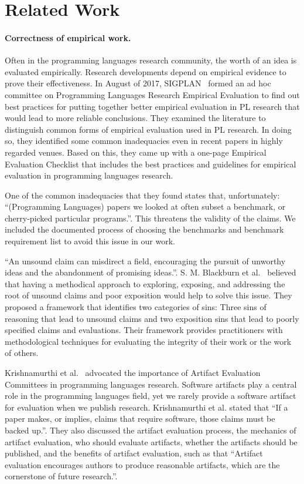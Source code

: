 \section{Related Work}

\paragraph{Correctness of empirical work.}


Often in the programming languages research community, the worth of an idea is evaluated empirically. Research developments depend on empirical evidence to prove their effectiveness.
In August of 2017, SIGPLAN~\cite{SIGPLAN} formed an ad hoc committee on Programming Languages Research Empirical Evaluation to find out best practices for putting together better empirical evaluation in PL research that would lead to more reliable conclusions. They examined the literature to distinguish common forms of empirical evaluation used in PL research. In doing so, they identified some common inadequacies even in recent papers in highly regarded venues. Based on this, they came up with a one-page Empirical Evaluation Checklist that includes the best practices and guidelines for empirical evaluation in programming languages research.

One of the common inadequacies that they found states that, unfortunately: ``(Programming Languages) papers we looked at often subset a benchmark, or cherry-picked particular programs.''. This threatens the validity of the claims. We included the documented process of choosing the benchmarks and benchmark requirement list to avoid this issue in our work.

``An unsound claim can misdirect a field, encouraging the pursuit of unworthy ideas and the abandonment of promising ideas.''. S. M. Blackburn et al.~\cite{truth_Blackburn} believed that having a methodical approach to exploring, exposing, and addressing the root of unsound claims and poor exposition would help to solve this issue. They proposed a framework that identifies two categories of sins: Three sins of reasoning that lead to unsound claims and two exposition sins that lead to poorly specified claims and evaluations. Their framework provides practitioners with methodological techniques for evaluating the integrity of their work or the work of others.

Krishnamurthi et al.~\cite{aec} advocated the importance of Artifact Evaluation Committees in programming languages research. Software artifacts play a central role in the programming languages field, yet we rarely provide a software artifact for evaluation when we publish research. Krishnamurthi et al. stated that ``If a paper makes, or implies, claims that require software, those claims must be backed up.''. They also discussed the artifact evaluation process, the mechanics of artifact evaluation, who should evaluate artifacts, whether the artifacts should be published, and the benefits of artifact evaluation, such as that ``Artifact evaluation encourages authors to produce reasonable artifacts, which are the cornerstone of future research.''.

